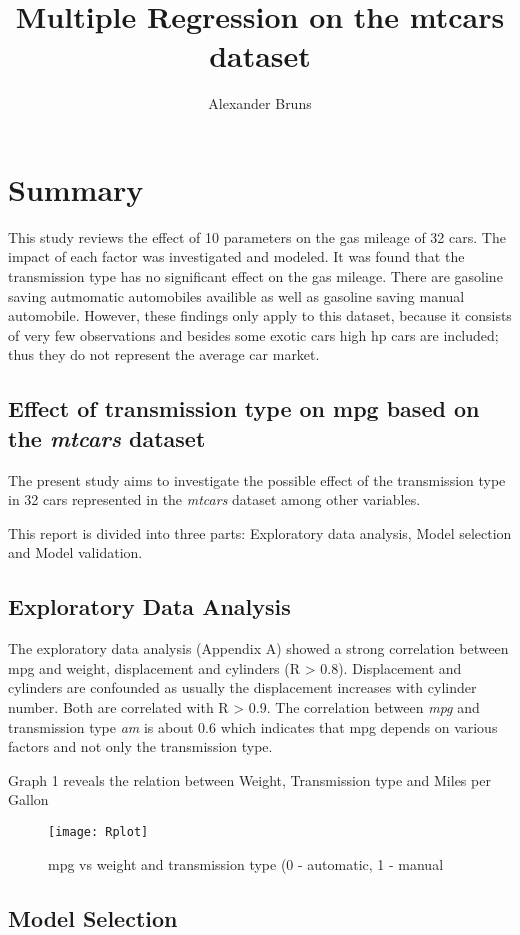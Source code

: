 \documentclass[10pt,a4paper]{article}
\author{Alexander Bruns}
\title{Multiple Regression on the mtcars dataset}
\begin{document}
	\section{Summary}
	This study reviews the effect of 10 parameters on the gas mileage of 32 cars. The impact of each factor was investigated and modeled. 
	It was found that the transmission type has no significant effect on the gas mileage. There are gasoline saving autmomatic automobiles availible as well as gasoline saving manual automobile.
	However, these findings only apply to this dataset, because it consists of very few  observations and besides some exotic cars high hp cars are included; thus they do not represent the average car market.
	\subsection{Effect of transmission type on mpg based on the \textit{mtcars} dataset}
	
	The present study aims to investigate the possible effect of the transmission type in 32 cars represented in the \textit{mtcars} dataset among other variables.
	
	This report is divided into three parts: Exploratory data analysis, Model selection and Model validation.
	
	\subsection{Exploratory Data Analysis}
	
	The exploratory data analysis (Appendix A) showed a strong correlation between mpg and weight, displacement and cylinders (R > 0.8). Displacement and cylinders are confounded as usually the displacement increases with cylinder number. Both are correlated with R > 0.9. The correlation between \textit{mpg} and transmission type \textit{am} is about 0.6 which indicates that mpg depends on various factors and not only the transmission type. 
	
	Graph 1 reveals the relation between Weight, Transmission type and Miles per Gallon
	
	\begin{figure}
\centering
\texttt{[image: Rplot]}
\caption[mpg vs weight and transmission type (0 - automatic, 1 - manual)]{mpg vs weight and transmission type (0 - automatic, 1 - manual}

\end{figure}
	
\subsection{Model Selection}
\end{document}
